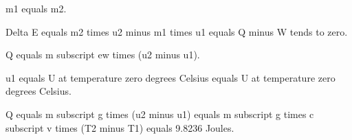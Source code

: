 m1 equals m2.

Delta E equals m2 times u2 minus m1 times u1 equals Q minus W tends to zero.

Q equals m subscript ew times (u2 minus u1).

u1 equals U at temperature zero degrees Celsius equals U at temperature zero degrees Celsius.

Q equals m subscript g times (u2 minus u1) equals m subscript g times c subscript v times (T2 minus T1) equals 9.8236 Joules.